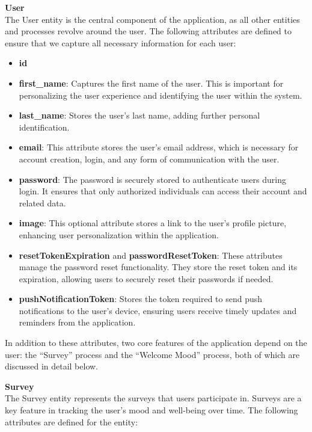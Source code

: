 \vspace{5mm}

\noindent \textbf{User} \\
The User entity is the central component of the application, as all other entities and processes revolve around the user. The following attributes are defined to ensure that we capture all necessary information for each user:

\begin{itemize}
    \item \textbf{id}
    \item \textbf{first\_name}: Captures the first name of the user. This is important for personalizing the user experience and identifying the user within the system.
    \item \textbf{last\_name}: Stores the user's last name, adding further personal identification.
    \item \textbf{email}: This attribute stores the user's email address, which is necessary for account creation, login, and any form of communication with the user.
    \item \textbf{password}: The password is securely stored to authenticate users during login. It ensures that only authorized individuals can access their account and related data.
    \item \textbf{image}: This optional attribute stores a link to the user’s profile picture, enhancing user personalization within the application.
    \item \textbf{resetTokenExpiration} and \textbf{passwordResetToken}: These attributes manage the password reset functionality. They store the reset token and its expiration, allowing users to securely reset their passwords if needed.
    \item \textbf{pushNotificationToken}: Stores the token required to send push notifications to the user's device, ensuring users receive timely updates and reminders from the application.
\end{itemize}

\noindent In addition to these attributes, two core features of the application depend on the user: the ``Survey'' process and the ``Welcome Mood'' process, both of which are discussed in detail below.

\vspace{5mm}

\noindent \textbf{Survey} \\
The Survey entity represents the surveys that users participate in. Surveys are a key feature in tracking the user's mood and well-being over time. The following attributes are defined for the entity:

